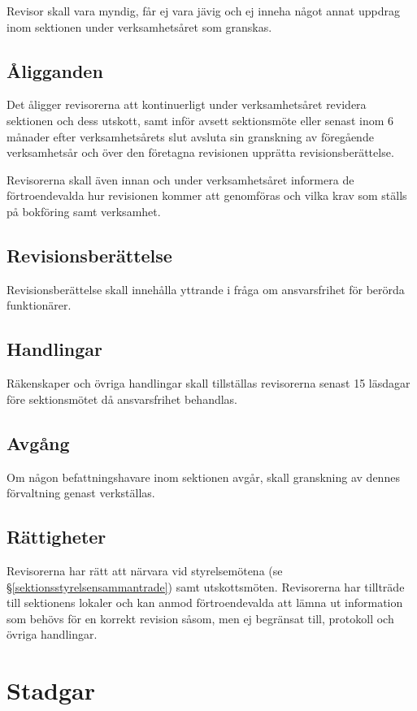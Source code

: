 \documentclass{datateknologsektionen-document}
\begin{document}
Revisor skall vara myndig, får ej vara jävig och ej inneha något annat uppdrag inom sektionen
under verksamhetsåret som granskas.

\subsection{Åligganden}
Det åligger revisorerna att kontinuerligt under verksamhetsåret revidera sektionen och dess utskott,
samt inför avsett sektionsmöte eller senast inom 6 månader efter verksamhetsårets slut avsluta sin
granskning av föregående verksamhetsår och över den företagna revisionen upprätta revisionsberättelse.

Revisorerna skall även innan och under verksamhetsåret informera de förtroendevalda hur revisionen
kommer att genomföras och vilka krav som ställs på bokföring samt verksamhet.

\subsection{Revisionsberättelse}
Revisionsberättelse skall innehålla yttrande i fråga om ansvarsfrihet för berörda
funktionärer.

\subsection{Handlingar}
Räkenskaper och övriga handlingar skall tillställas revisorerna senast 15 läsdagar före
sektionsmötet då ansvarsfrihet behandlas.

\subsection{Avgång}
Om någon befattningshavare inom sektionen avgår, skall granskning av dennes
förvaltning genast verkställas.

\subsection{Rättigheter}
Revisorerna har rätt att närvara vid styrelsemötena (se \S \ref{sektionsstyrelsensammantrade})
samt utskottsmöten. Revisorerna har tillträde till sektionens lokaler och kan anmod
förtroendevalda att lämna ut information som behövs för en korrekt revision såsom,
men ej begränsat till, protokoll och övriga handlingar.

\section{Stadgar}
\end{document}
